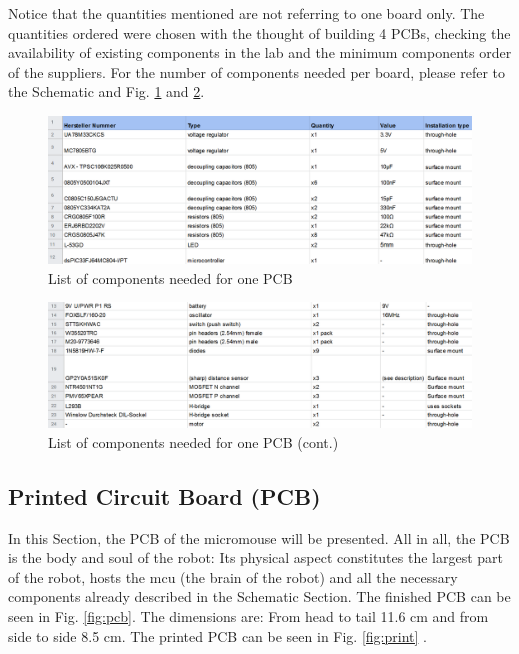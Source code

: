 Notice that the quantities mentioned are not referring to one board only. The quantities ordered were chosen with the thought of building 4 PCBs, checking the availability of existing components in the lab and the minimum components order of the suppliers. 
For the number of components needed per board, please refer to the Schematic and Fig. \ref{fig:comp1} and \ref{fig:comp2}.

\begin{figure}[htb]
    \centering
    \includegraphics[width=1\textwidth]{figures/hardware/CompList.PNG}
    \caption{List of components needed for one PCB}
    \label{fig:comp1}
\end{figure}


\begin{figure}[htb]
    \centering
    \includegraphics[width=1\textwidth]{figures/hardware/CompList2.PNG}
    \caption{List of components needed for one PCB (cont.)}
    \label{fig:comp2}
\end{figure}
\FloatBarrier

\vspace{1cm}


\subsection{Printed Circuit Board (PCB)}

In this Section, the PCB of the micromouse will be presented. All in all, the PCB is the body and soul of the robot: Its physical aspect constitutes the largest part of the robot, hosts the mcu (the brain of the robot) and all the necessary components already described in the Schematic Section. 
The finished PCB can be seen in Fig. \ref{fig:pcb}. The dimensions are: From head to tail 11.6 cm and from side to side 8.5 cm. The printed PCB can be seen in Fig. \ref{fig:print} .

